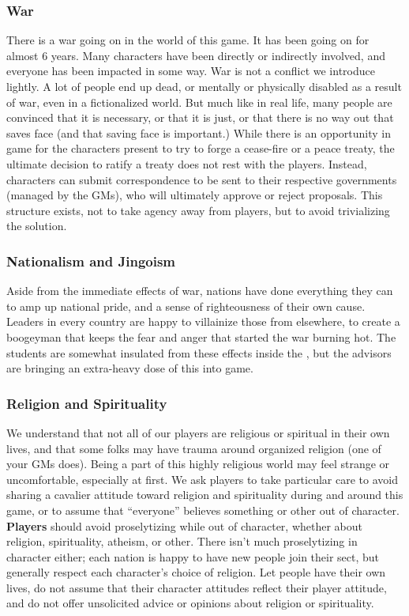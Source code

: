 \documentclass[sheet]{GL2020}
\begin{document}
\subsubsection{War}
There is a war going on in the world of this game. It has been going on for almost 6 years. Many characters have been directly or indirectly involved, and everyone has been impacted in some way. War is not a conflict we introduce lightly. A lot of people end up dead, or mentally or physically disabled as a result of war, even in a fictionalized world. But much like in real life, many people are convinced that it is necessary, or that it is just, or that there is no way out that saves face (and that saving face is important.) While there is an opportunity in game for the characters present to try to forge a cease-fire or a peace treaty, the ultimate decision to ratify a treaty does not rest with the players. Instead, characters can submit correspondence to be sent to their respective governments (managed by the GMs), who will ultimately approve or reject proposals. This structure exists, not to take agency away from players, but to avoid trivializing the solution. 

\subsubsection{Nationalism and Jingoism}
Aside from the immediate effects of war, nations have done everything they can to amp up national pride, and a sense of righteousness of their own cause. Leaders in every country are happy to villainize those from elsewhere, to create a boogeyman that keeps the fear and anger that started the war burning hot. The students are somewhat insulated from these effects inside the \pSchool{}, but the advisors are bringing an extra-heavy dose of this into game.

\subsubsection{Religion and Spirituality}
We understand that not all of our players are religious or spiritual in their own lives, and that some folks may have trauma around organized religion (one of your GMs does). Being a part of this highly religious world may feel strange or uncomfortable, especially at first. We ask players to take particular care to avoid sharing a cavalier attitude toward religion and spirituality during and around this game, or to assume that ``everyone'' believes something or other out of character. \textbf{Players} should avoid proselytizing while out of character, whether about religion, spirituality, atheism, or other. There isn't much proselytizing in character either; each nation is happy to have new people join their sect, but generally respect each character's choice of religion. Let people have their own lives, do not assume that their character attitudes reflect their player attitude, and do not offer unsolicited advice or opinions about religion or spirituality.
\end{document}
